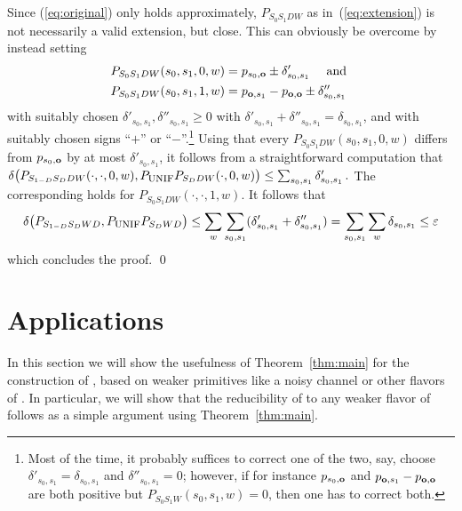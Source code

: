 Since (\ref{eq:original}) only holds approximately, $P_{S_0 S_1 D W}$
as in~(\ref{eq:extension}) is not necessarily a valid extension, but
close. This can obviously be overcome by instead setting
\begin{align*}
P_{S_0 S_1 D W}(s_0,s_1,0,w) &= p_{s_0,\text{\boldmath${\bf o}$}} \pm \delta'_{s_0,s_1}
\quad \text{ and }\\
P_{S_0 S_1 D W}(s_0,s_1,1,w) &= p_{\text{\boldmath${\bf o}$},s_1}-p_{\text{\boldmath${\bf o}$},\text{\boldmath${\bf o}$}} \pm \delta''_{s_0,s_1}
\end{align*}
with suitably chosen $\delta'_{s_0,s_1},\delta''_{s_0,s_1} \geq 0$
with $\delta'_{s_0,s_1}+\delta''_{s_0,s_1} = \delta_{s_0,s_1}$, and
with suitably chosen signs ``$+$'' or ``$-$''.\footnote{Most of the
  time, it probably suffices to correct one of the two, say, choose
  $\delta'_{s_0,s_1} = \delta_{s_0,s_1}$ and $\delta''_{s_0,s_1} = 0$;
  however, if for instance $p_{s_0,\text{\boldmath${\bf o}$}}$ and $p_{\text{\boldmath${\bf o}$},s_1} -
  p_{\text{\boldmath${\bf o}$},\text{\boldmath${\bf o}$}}$ are both positive but $P_{S_0 S_1 W}(s_0,s_1,w) =
  0$, then one has to correct both. } Using that every $P_{S_0 S_1 D
  W}(s_0,s_1,0,w)$ differs from $p_{s_0,\text{\boldmath${\bf o}$}}$ by at most
$\delta'_{s_0,s_1}$, it follows from a straightforward computation
that $ \delta\big(P_{S_{1-D} S_D D W}(\cdot,\cdot,0,w),P_{\mbox{\sc unif}} P_{S_D D
    W}(\cdot,0,w)\big) \leq \sum_{s_0,s_1} \delta'_{s_0,s_1} \, .  $ The
corresponding holds for $P_{S_0 S_1 D W}(\cdot,\cdot,1,w)$. It follows
that
\begin{align*}
  \delta\big(P_{S_{1-D} S_D W D},P_{\mbox{\sc unif}} P_{S_D W D}\big) \leq \sum_w
  \sum_{s_0,s_1} (\delta'_{s_0,s_1} + \delta''_{s_0,s_1}) =
  \sum_{s_0,s_1} \sum_w \delta_{s_0,s_1} \leq \varepsilon
\end{align*}  
which concludes the proof. \qed


\section{Applications}\label{sec:application}

In this section we will show the usefulness of Theorem~\ref{thm:main}
for the construction of \lStringOT, based on weaker primitives like a
noisy channel or other flavors of \pOT.  In particular, we will show
that the reducibility of \OT to any weaker flavor of \pOT follows as
a simple argument using Theorem~\ref{thm:main}.


